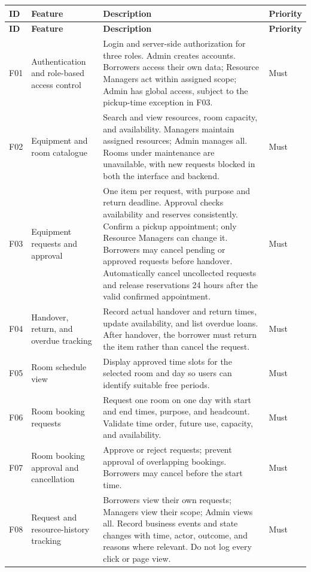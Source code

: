 \documentclass[11pt]{article}
\begin{document}
\begin{longtable}{@{}L{0.75cm}L{3.2cm}L{9.45cm}L{1.65cm}@{}}
\toprule
\textbf{ID} & \textbf{Feature} & \textbf{Description} & \textbf{Priority} \\
\midrule
\endfirsthead
\toprule
\textbf{ID} & \textbf{Feature} & \textbf{Description} & \textbf{Priority} \\
\midrule
\endhead
F01 & Authentication and role-based access control & Login and server-side authorization for three roles. Admin creates accounts. Borrowers access their own data; Resource Managers act within assigned scope; Admin has global access, subject to the pickup-time exception in F03. & Must \\
F02 & Equipment and room catalogue & Search and view resources, room capacity, and availability. Managers maintain assigned resources; Admin manages all. Rooms under maintenance are unavailable, with new requests blocked in both the interface and backend. & Must \\
F03 & Equipment requests and approval & One item per request, with purpose and return deadline. Approval checks availability and reserves consistently. Confirm a pickup appointment; only Resource Managers can change it. Borrowers may cancel pending or approved requests before handover. Automatically cancel uncollected requests and release reservations 24 hours after the valid confirmed appointment. & Must \\
F04 & Handover, return, and overdue tracking & Record actual handover and return times, update availability, and list overdue loans. After handover, the borrower must return the item rather than cancel the request. & Must \\
F05 & Room schedule view & Display approved time slots for the selected room and day so users can identify suitable free periods. & Must \\
F06 & Room booking requests & Request one room on one day with start and end times, purpose, and headcount. Validate time order, future use, capacity, and availability. & Must \\
F07 & Room booking approval and cancellation & Approve or reject requests; prevent approval of overlapping bookings. Borrowers may cancel before the start time. & Must \\
F08 & Request and resource-history tracking & Borrowers view their own requests; Managers view their scope; Admin views all. Record business events and state changes with time, actor, outcome, and reasons where relevant. Do not log every click or page view. & Must \\

\end{longtable}
\end{document}
